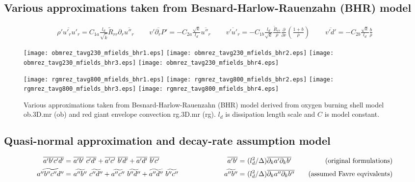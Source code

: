 \documentclass[10pt,paper=a4]{report}
\newcommand{\eht}{\overline}
\newcommand{\fht}{\widetilde}
\begin{document}
\newpage

\subsection{Various approximations taken from Besnard-Harlow-Rauenzahn (BHR) model}

\begin{align}
\eht{\rho'u'_ru'_r} = C_{1a} \frac{l_d}{\sqrt{\fht{k}}} \fht{R}_{rr} \partial_r \overline{u''_r} \ \ \ \ \ \ \ \ \ \ \eht{v' \partial_r P'} = -C_{2a} \frac{\sqrt{k}}{l_d} \eht{u''_r}  \ \ \ \ \ \ \ \ \ \ \eht{v'u'_r} = -C_{1b} \frac{l_d}{\sqrt{k}} \frac{\fht{R}_{rr}}{\eht{\rho}}\frac{\partial}{\partial r} \left( \frac{1+b}{\eht{\rho}} \right) \ \ \ \ \ \ \ \ \ \ \eht{v'd'} =  -C_{2b} \frac{\sqrt{k}}{l_d} \frac{b}{\eht{\rho}} \nonumber
\end{align}

\begin{figure}[!h]
\centerline{
\texttt{[image: obmrez\_tavg230\_mfields\_bhr1.eps]}
\texttt{[image: obmrez\_tavg230\_mfields\_bhr2.eps]}
\texttt{[image: obmrez\_tavg230\_mfields\_bhr3.eps]}
\texttt{[image: obmrez\_tavg230\_mfields\_bhr4.eps]}}

\centerline{
\texttt{[image: rgmrez\_tavg800\_mfields\_bhr1.eps]}
\texttt{[image: rgmrez\_tavg800\_mfields\_bhr2.eps]}
\texttt{[image: rgmrez\_tavg800\_mfields\_bhr3.eps]}
\texttt{[image: rgmrez\_tavg800\_mfields\_bhr4.eps]}}
\caption{Various approximations taken from Besnard-Harlow-Rauenzahn (BHR) model derived from  oxygen burning shell model {\sf ob.3D.mr} (ob) and red giant envelope convection {\sf rg.3D.mr} (rg). $l_d$ is dissipation length scale and $C$ is model constant. \label{fig:bhr-models}}
\end{figure}

\newpage

\subsection{Quasi-normal approximation and decay-rate assumption model}

\begin{align}
\eht{a'b'c'd'} = & \ \overline{a'b'} \ \overline{c'd'} + \overline{a'c'} \ \overline{b'd'} + \overline{a'd'} \ \overline{b'c'} \hspace{2.cm} & \overline{a'b'} = & \ (l_d^2 / \Delta) \overline{\partial_k a' \partial_k b'} & \ \ \ \mbox{(original formulations)} \\
\fht{a''b''c''d''} = & \ \fht{a''b''} \ \fht{c''d''} + \fht{a''c''} \ \fht{b''d''} + \fht{a''d''} \ \fht{b''c''} \hspace{2.cm} & \fht{a''b''} = & \ (l_d^2 / \Delta) \overline{\partial_k a'' \partial_k b''} & \ \ \ \mbox{(assumed Favre eqvivalents)}
\end{align}
\end{document}
